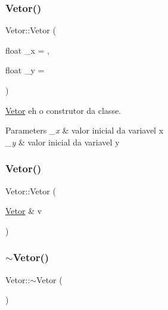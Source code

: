 \subsubsection{\texorpdfstring{Vetor()}{Vetor()}\hspace{0.1cm}{\footnotesize\ttfamily [1/2]}}
{\footnotesize\ttfamily Vetor\+::\+Vetor (\begin{DoxyParamCaption}\item[{float}]{\+\_\+x = {},  }\item[{float}]{\+\_\+y = {} }\end{DoxyParamCaption})}



\hyperlink{class_vetor}{Vetor} eh o construtor da classe. 


\begin{DoxyParams}{Parameters}
{\em \+\_\+x} & valor inicial da variavel x \\
\hline
{\em \+\_\+y} & valor inicial da variavel y \\
\hline
\end{DoxyParams}
\mbox{\label{class_vetor_a63ba9d34a0a98b151f3d85c2b4f54278}} 
\subsubsection{\texorpdfstring{Vetor()}{Vetor()}\hspace{0.1cm}{\footnotesize\ttfamily [2/2]}}
{\footnotesize\ttfamily Vetor\+::\+Vetor (\begin{DoxyParamCaption}\item[{\hyperlink{class_vetor}{Vetor} \&}]{v }\end{DoxyParamCaption})}

\mbox{\label{class_vetor_a7396a0492de44676a977c593d36e061c}} 
\subsubsection{\texorpdfstring{$\sim$\+Vetor()}{~Vetor()}}
{\footnotesize\ttfamily Vetor\+::$\sim$\+Vetor (\begin{DoxyParamCaption}{ }\end{DoxyParamCaption})}



